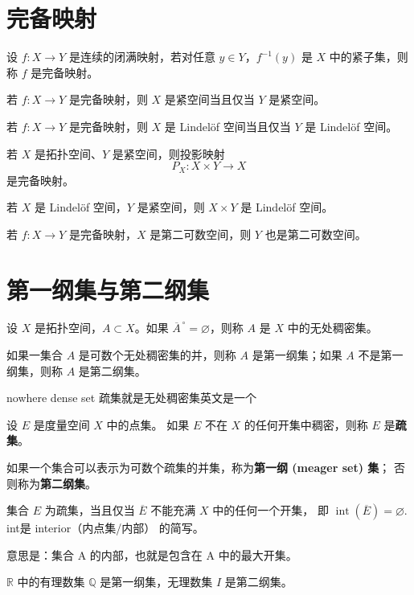 \section{完备映射}
\begin{definition}[完备映射=连续闭满+像中所有点的原像集都是紧的]
设 $f:X\to Y$ 是连续的闭满映射，若对任意 $y\in Y$，$f^{-1}(y)$ 是 $X$ 中的紧子集，则称 $f$ 是完备映射。
\end{definition}
\begin{theorem}
若 $f:X\to Y$ 是完备映射，则 $X$ 是紧空间当且仅当 $Y$ 是紧空间。
\end{theorem}
\begin{theorem}[完备映射保持林德洛夫空间]
若 $f:X\to Y$ 是完备映射，则 $X$ 是 Lindelöf 空间当且仅当 $Y$ 是 Lindelöf 空间。
\end{theorem}

\begin{theorem}[拓扑*紧映射到自己是完备的]
若 $X$ 是拓扑空间、$Y$ 是紧空间，则投影映射 
\[
P_X : X\times Y \to X
\]
是完备映射。
\end{theorem}
\begin{corollary}[林德洛夫*紧=林德洛夫]
若 $X$ 是 Lindelöf 空间，$Y$ 是紧空间，则 $X\times Y$ 是 Lindelöf 空间。
\end{corollary}

\begin{theorem}[完备保持第二可数]
若 $f:X\to Y$ 是完备映射，$X$ 是第二可数空间，则 $Y$ 也是第二可数空间。
\end{theorem}

\section{第一纲集与第二纲集}
\begin{definition}[第一纲集与第二纲集]
设 $X$ 是拓扑空间，$A\subset X$。如果 $\overline{A}^{\,\circ}=\varnothing$，则称 $A$ 是 $X$ 中的无处稠密集。

如果一集合 $A$ 是可数个无处稠密集的并，则称 $A$ 是第一纲集；如果 $A$ 不是第一纲集，则称 $A$ 是第二纲集。
\end{definition}
\begin{note}
     nowhere dense set 疏集就是无处稠密集英文是一个
\end{note}
\begin{definition}
设 $E$ 是度量空间 $X$ 中的点集。  
如果 $E$ 不在 $X$ 的任何开集中稠密，则称 $E$ 是\textbf{疏集}。  

如果一个集合可以表示为可数个疏集的并集，称为\textbf{第一纲 (meager set) 集}；  
否则称为\textbf{第二纲集}。
\end{definition}
集合 $E$ 为疏集，当且仅当 $\overline{E}$ 不能充满 $X$ 中的任何一个开集，
即
$
\operatorname{int}(\overline{E}) = \varnothing.
$int是 interior（内点集/内部） 的简写。

意思是：集合 A 的内部，也就是包含在 A 中的最大开集。
\begin{example}
$\mathbb{R}$ 中的有理数集 $\mathbb{Q}$ 是第一纲集，无理数集 $I$ 是第二纲集。
\end{example}